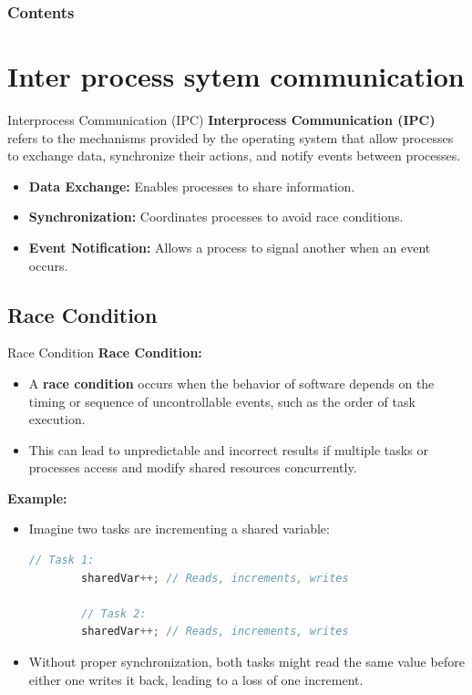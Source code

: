 \documentclass[10pt]{beamer}
\title[Universidad Panamericana]{}
\subtitle{FreeRTOS synchronization methods}
\author[]{Name}
\institute[ltonix@up.edu.mx]{Universidad Panamericana}
\date[Presentation \today]{Presentation \today}
\begin{document}
\frame{\titlepage}
\begin{frame}
\frametitle{Contents}
\tableofcontents
\end{frame}

\section{Inter process sytem communication}
\begin{frame}{Interprocess Communication (IPC)}
    \textbf{Interprocess Communication (IPC)} refers to the mechanisms provided by the operating system that allow processes to exchange data, synchronize their actions, and notify events between processes.
    \begin{itemize}
        \item \textbf{Data Exchange:} Enables processes to share information.
        \item \textbf{Synchronization:} Coordinates processes to avoid race conditions.
        \item \textbf{Event Notification:} Allows a process to signal another when an event occurs.
    \end{itemize}
\end{frame}

\subsection{Race Condition}
\begin{frame}[fragile]{Race Condition}
    \textbf{Race Condition:}
    \begin{itemize}
        \item A \textbf{race condition} occurs when the behavior of software depends on the timing or sequence of uncontrollable events, such as the order of task execution.
        \item This can lead to unpredictable and incorrect results if multiple tasks or processes access and modify shared resources concurrently.
    \end{itemize}
    \textbf{Example:}
    \begin{itemize}
        \item Imagine two tasks are incrementing a shared variable:
        \begin{lstlisting}[language=C, basicstyle=\ttfamily\small]
        // Task 1:
        sharedVar++; // Reads, increments, writes
        
        // Task 2:
        sharedVar++; // Reads, increments, writes
        \end{lstlisting}
        \item Without proper synchronization, both tasks might read the same value before either one writes it back, leading to a loss of one increment.
    \end{itemize}

\end{frame}
\end{document}
